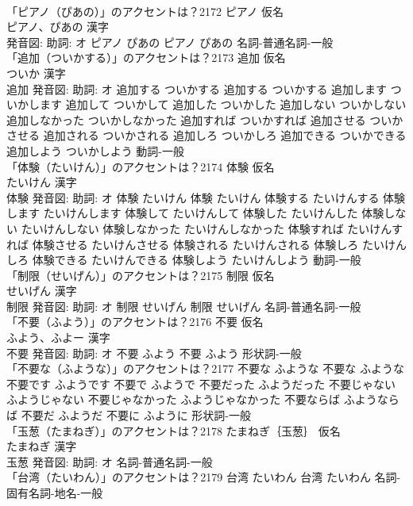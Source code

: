 \documentclass[8pt]{extreport}
\begin{document}
\begin{CJK}{UTF8}{min}
\\	「ピアノ（ぴあの）」のアクセントは？2172	ピアノ 仮名　
\\	ピアノ、ぴあの 漢字　
\\	発音図: 助詞: オ	ピアノ ぴあの		ピアノ ぴあの				名詞-普通名詞-一般 
\\	「追加（ついかする）」のアクセントは？2173	追加 仮名　
\\	ついか 漢字　
\\	追加 発音図: 助詞: オ	追加する ついかする		追加する ついかする 追加します ついかします 追加して ついかして 追加した ついかした 追加しない ついかしない 追加しなかった ついかしなかった 追加すれば ついかすれば 追加させる ついかさせる 追加される ついかされる 追加しろ ついかしろ 追加できる ついかできる 追加しよう ついかしよう				動詞-一般 
\\	「体験（たいけん）」のアクセントは？2174	体験 仮名　
\\	たいけん 漢字　
\\	体験 発音図: 助詞: オ	体験 たいけん		体験 たいけん 体験する たいけんする 体験します たいけんします 体験して たいけんして 体験した たいけんした 体験しない たいけんしない 体験しなかった たいけんしなかった 体験すれば たいけんすれば 体験させる たいけんさせる 体験される たいけんされる 体験しろ たいけんしろ 体験できる たいけんできる 体験しよう たいけんしよう				動詞-一般 
\\	「制限（せいげん）」のアクセントは？2175	制限 仮名　
\\	せいげん 漢字　
\\	制限 発音図: 助詞: オ	制限 せいげん		制限 せいげん				名詞-普通名詞-一般 
\\	「不要（ふよう）」のアクセントは？2176	不要 仮名　
\\	ふよう、ふよー 漢字　
\\	不要 発音図: 助詞: オ	不要 ふよう		不要 ふよう				形状詞-一般 
\\	「不要な（ふような）」のアクセントは？2177		不要な ふような		不要な ふような 不要です ふようです 不要で ふようで 不要だった ふようだった 不要じゃない ふようじゃない 不要じゃなかった ふようじゃなかった 不要ならば ふようならば 不要だ ふようだ 不要に ふように				形状詞-一般 
\\	「玉葱（たまねぎ）」のアクセントは？2178	たまねぎ｛玉葱｝ 仮名　
\\	たまねぎ 漢字　
\\	玉葱 発音図: 助詞: オ							名詞-普通名詞-一般 
\\	「台湾（たいわん）」のアクセントは？2179		台湾 たいわん		台湾 たいわん				名詞-固有名詞-地名-一般 

\end{CJK}
\end{document}

